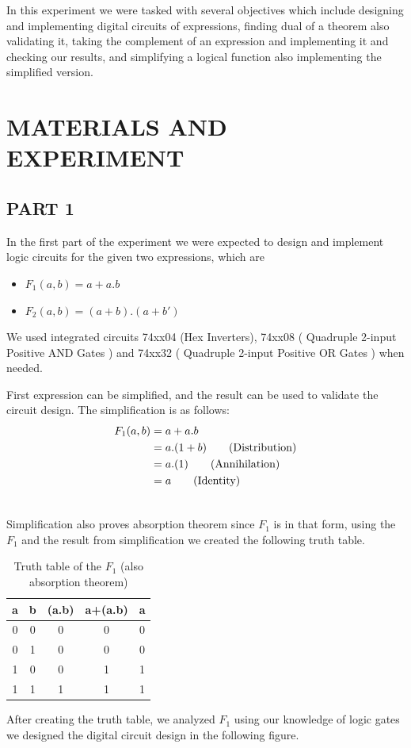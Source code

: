 \documentclass[pdftex,12pt,a4paper]{article}
\begin{document}
In this experiment we were tasked with several objectives which include designing and implementing digital circuits of expressions, finding dual of a theorem also validating it, taking the complement of an expression and implementing it and checking our results, and simplifying a logical function also implementing the simplified version. 

\section{MATERIALS AND EXPERIMENT}

\subsection{PART 1}
In the first part of the experiment we were expected to design and implement logic circuits for the given two expressions, which are
\begin{itemize}
    \item $F_{1}(a,b) = a + a . b$
    \item $F_{2}(a,b) = (a + b) . (a + b')$
\end{itemize}
We used integrated circuits 74xx04 (Hex Inverters), 74xx08  ( Quadruple 2-input Positive AND Gates ) and 74xx32 ( Quadruple 2-input Positive OR Gates ) when needed.

First expression can be simplified, and the result can be used to validate the circuit design. The simplification is as follows:
\begin{align}
F_{1}(a,b) &= a + a . b\notag\\ 
&= a . ( 1 + b ) \tag{Distribution} \\
&= a . ( 1 ) \tag{Annihilation} \\
&= a \tag{Identity} \\
\notag \end{align}

Simplification also proves absorption theorem since $F_{1}$ is in that form, using the $F_{1}$ and the result from simplification we created the following truth table.

\begin{table}[H]
\centering
\begin{tabular}{|c|c|c|c|c|}
\hline
a & b & (a.b) & a+(a.b)  & a      \\ \hline
0 & 0 & 0 & 0       & 0        \\ 
0 & 1 & 0 & 0       & 0        \\ 
1 & 0 & 0 & 1       & 1        \\ 
1 & 1 & 1 & 1       & 1        \\  \hline
\end{tabular}
\caption{Truth table of the $F_{1}$ (also absorption theorem)}
\label{Table 1}
\end{table}
\clearpage
After creating the truth table, we analyzed $F_{1}$ using our knowledge of logic gates we designed the digital circuit design in the following figure.
\end{document}

